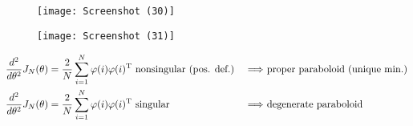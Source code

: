 \begin{figure}
\centering
\begin{minipage}{.5\textwidth}
  \centering
  \texttt{[image: Screenshot (30)]}
  \label{fig:test1}
\end{minipage}%
\begin{minipage}{.5\textwidth}
  \centering
  \texttt{[image: Screenshot (31)]}
  \label{fig:test2}
\end{minipage}
\end{figure}


\begin{equation*}
\begin{aligned}
\frac{d^{2}}{d\theta ^{2}} J_{N}( \theta ) & =\frac{2}{N}\sum _{i=1}^{N} \varphi ( i) \varphi ( i)\transpose \ \text{nonsingular} \ \text{(pos. def.)} & \Longrightarrow \ & \text{proper paraboloid (unique min.)}\\
\frac{d^{2}}{d\theta ^{2}} J_{N}( \theta ) & =\frac{2}{N}\sum _{i=1}^{N} \varphi ( i) \varphi ( i)\transpose\text{ singular} & \ \Longrightarrow \ & \text{degenerate paraboloid}
\end{aligned}
\end{equation*}

